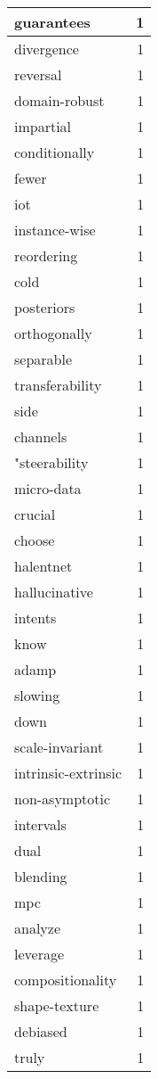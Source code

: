 \begin{table}[h]
\begin{tabular}{|l|r|}
\hline
guarantees & 1 \\
\hline
divergence & 1 \\
\hline
reversal & 1 \\
\hline
domain-robust & 1 \\
\hline
impartial & 1 \\
\hline
conditionally & 1 \\
\hline
fewer & 1 \\
\hline
iot & 1 \\
\hline
instance-wise & 1 \\
\hline
reordering & 1 \\
\hline
cold & 1 \\
\hline
posteriors & 1 \\
\hline
orthogonally & 1 \\
\hline
separable & 1 \\
\hline
transferability & 1 \\
\hline
side & 1 \\
\hline
channels & 1 \\
\hline
"steerability & 1 \\
\hline
micro-data & 1 \\
\hline
crucial & 1 \\
\hline
choose & 1 \\
\hline
halentnet & 1 \\
\hline
hallucinative & 1 \\
\hline
intents & 1 \\
\hline
know & 1 \\
\hline
adamp & 1 \\
\hline
slowing & 1 \\
\hline
down & 1 \\
\hline
scale-invariant & 1 \\
\hline
intrinsic-extrinsic & 1 \\
\hline
non-asymptotic & 1 \\
\hline
intervals & 1 \\
\hline
dual & 1 \\
\hline
blending & 1 \\
\hline
mpc & 1 \\
\hline
analyze & 1 \\
\hline
leverage & 1 \\
\hline
compositionality & 1 \\
\hline
shape-texture & 1 \\
\hline
debiased & 1 \\
\hline
truly & 1 \\

\end{tabular}
\end{table}

